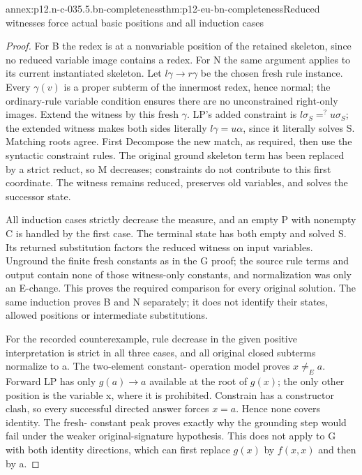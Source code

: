 \begin{annexitem}{annex:p12.n-c-035.5.bn-completeness}{thm:p12-eu-bn-completeness}{Reduced witnesses force actual basic positions and all induction cases}
\begin{proof}
For B the redex is at a nonvariable position of the retained
skeleton, since no reduced variable image contains a redex.
For N the same argument applies to its current instantiated
skeleton. Let \(l\gamma\to r\gamma\) be the chosen fresh
rule instance. Every \(\gamma(v)\) is a proper subterm of
the innermost redex, hence normal; the ordinary-rule variable
condition ensures there are no unconstrained right-only images.
Extend the witness by this fresh \(\gamma\). LP's added
constraint is \(l\sigma_S=^{?}u\sigma_S\); the extended
witness makes both sides literally \(l\gamma=u\alpha\),
since it literally solves S. Matching roots agree. First
Decompose the new match, as required, then use the syntactic
constraint rules. The original ground skeleton term has been
replaced by a strict reduct, so M decreases; constraints do not
contribute to this first coordinate. The witness remains reduced,
preserves old variables, and solves the successor state.

All induction cases strictly decrease the measure, and an empty
P with nonempty C is handled by the first case. The terminal
state has both empty and solved S. Its returned substitution
factors the reduced witness on input variables. Unground the
finite fresh constants as in the G proof; the source rule terms
and output contain none of those witness-only constants, and
normalization was only an E-change. This proves the required
comparison for every original solution. The same induction
proves B and N separately; it does not identify their states,
allowed positions or intermediate substitutions.

For the recorded counterexample, rule decrease in the given
positive interpretation is strict in all three cases, and all
original closed subterms normalize to a. The two-element constant-
operation model proves \(x\ne_E a\). Forward LP has only
\(g(a)\to a\) available at the root of \(g(x)\); the only
other position is the variable x, where it is prohibited.
Constrain has a constructor clash, so every successful directed
answer forces \(x=a\). Hence none covers identity. The fresh-
constant peak proves exactly why the grounding step would fail
under the weaker original-signature hypothesis. This does not
apply to G with both identity directions, which can first replace
\(g(x)\) by \(f(x,x)\) and then by a.
\end{proof}
\end{annexitem}

